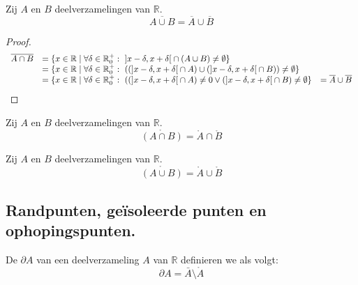 \documentclass[main.tex]{subfiles}
\begin{document}
\begin{st}
  Zij $A$ en $B$ deelverzamelingen van $\mathbb{R}$.
  \[ \overline{A \cup B} = \overline{A} \cup \overline{B} \]

  \begin{proof}
    \[
    \begin{array}{rll}
      \overline{A \cap B} 
      &= \{ x\in \mathbb{R} \mid \forall \delta \in \mathbb{R}_{0}^{+}:\ \interval[open]{x-\delta}{ x+\delta} \cap (A \cup B) \neq \emptyset \}\\
      &= \{ x\in \mathbb{R} \mid \forall \delta \in \mathbb{R}_{0}^{+}:\ ((\interval[open]{x-\delta}{ x+\delta} \cap A) \cup (\interval[open]{x-\delta}{ x+\delta} \cap B)) \neq \emptyset \}\\
      &= \{ x\in \mathbb{R} \mid \forall \delta \in \mathbb{R}_{0}^{+}:\ ((\interval[open]{x-\delta}{ x+\delta} \cap A) \neq 0 \vee (\interval[open]{x-\delta}{ x+\delta} \cap B) \neq \emptyset \}
      &= \overline{A} \cup \overline{B} \\
    \end{array}
    \]
  \end{proof}
\feed
{}
\end{st}


\begin{st}
  Zij $A$ en $B$ deelverzamelingen van $\mathbb{R}$.
  \[ \mathring{\left(A \cap B\right)} = \mathring{A} \cap \mathring{B} \]

\end{st}

\begin{st}
  Zij $A$ en $B$ deelverzamelingen van $\mathbb{R}$.
  \[ \mathring{\left(A \cup B\right)} = \mathring{A} \cup \mathring{B} \]

\end{st}

\subsection{Randpunten, ge\"isoleerde punten en ophopingspunten.}
\label{sec:randp-geis-punt}

\begin{de}
  De  $\partial A$ van een deelverzameling $A$ van $\mathbb{R}$ definieren we als volgt:
  \[ \partial A = \bar{A} \setminus \mathring{A} \]
\end{de}
\end{document}
